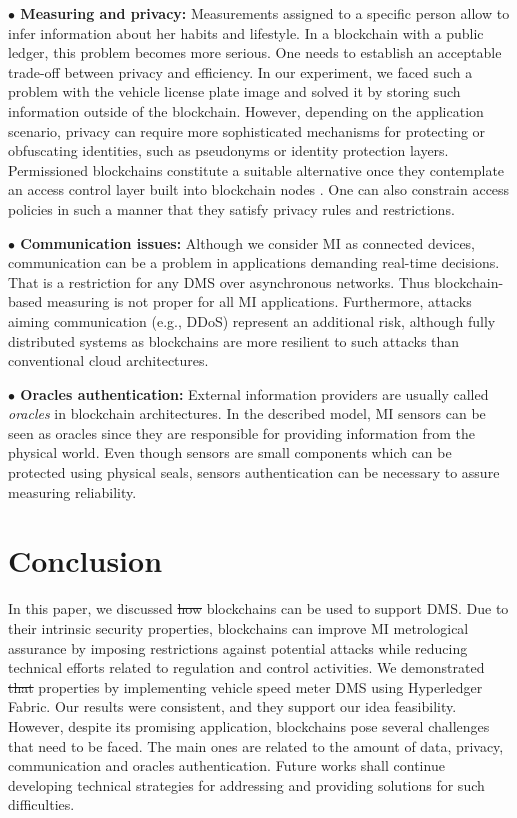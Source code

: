 \documentclass[journal]{IEEEtran}
\providecommand{\DIFadd}[1]{{\protect\color{blue}\uwave{#1}}} %
\providecommand{\DIFdel}[1]{{\protect\color{red}\sout{#1}}}                      %
\providecommand{\DIFaddbegin}{} %
\providecommand{\DIFaddend}{} %
\providecommand{\DIFdelbegin}{} %
\providecommand{\DIFdelend}{} %
\begin{document}
\textbf{$\bullet$ Measuring and privacy:} Measurements assigned to a specific person allow to infer information about her habits and lifestyle. 
In a blockchain with a public ledger, this problem becomes more serious. 
One needs to establish an acceptable trade-off between privacy and efficiency.
In our experiment, we faced such a problem with the vehicle license plate image and solved it by storing such information outside of the blockchain.
However, depending on the application scenario, privacy can require more sophisticated mechanisms for protecting or obfuscating identities, such as pseudonyms or identity protection layers. 
Permissioned blockchains constitute a suitable alternative once they contemplate an access control layer built into blockchain nodes \cite{Vukolic2016}. 
One can also constrain access policies in such a manner that they satisfy privacy rules and restrictions.

\textbf{$\bullet$ Communication issues:} Although we consider MI as connected devices, communication can be a problem in applications demanding real-time decisions. 
That is a restriction for any DMS over asynchronous networks. 
Thus blockchain-based measuring is not proper for all MI applications. 
Furthermore, attacks aiming communication (e.g., DDoS) represent an additional risk, although fully distributed systems as blockchains are more resilient to such attacks than conventional cloud architectures.

\textbf{$\bullet$ Oracles authentication:} External information providers are usually called \emph{oracles} in blockchain architectures. 
In the described model, MI sensors can be seen as oracles since they are responsible for providing information from the physical world. 
Even though sensors are small components which can be protected using physical seals, sensors authentication can be necessary to assure measuring reliability.

\section{Conclusion}
In this paper, we discussed \DIFdelbegin \DIFdel{how }\DIFdelend \DIFaddbegin \DIFadd{a way }\DIFaddend blockchains can be used to support DMS.
Due to their intrinsic security properties, blockchains can improve MI metrological assurance by imposing restrictions against potential attacks while reducing technical efforts related to regulation and control activities.
We demonstrated \DIFdelbegin \DIFdel{that }\DIFdelend \DIFaddbegin \DIFadd{those }\DIFaddend properties by implementing \DIFaddbegin \DIFadd{a }\DIFaddend vehicle speed meter DMS using Hyperledger Fabric.
Our results were consistent, and they support our idea feasibility. 
However, despite its promising application, blockchains pose several challenges that need to be faced. 
The main ones are related to the amount of data, privacy, communication and oracles authentication. 
Future works shall continue developing technical strategies for addressing and providing solutions for such difficulties.
\end{document}
